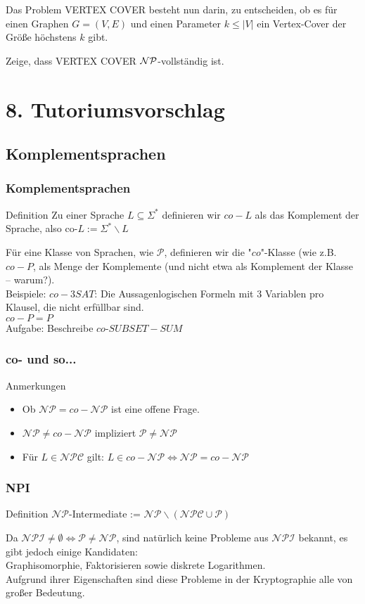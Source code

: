 \documentclass{beamer}
\begin{document}
{\begin{frame}
Das Problem \textsc{VERTEX COVER} besteht nun darin, zu entscheiden, ob es
für einen Graphen $G=(V,E)$ und einen Parameter $k \leq |V|$ ein Vertex-Cover
der Größe höchstens $k$ gibt.

Zeige, dass \textsc{VERTEX COVER} $\cal{NP}$-vollständig ist. 
\end{frame}

\section{8. Tutoriumsvorschlag}
\subsection{Komplementsprachen}
\begin{frame}
\frametitle{Komplementsprachen}
\begin{block}{Definition}
Zu einer Sprache $L \subseteq \Sigma^*$ definieren wir $co-L$ als das Komplement der Sprache, also
$\mbox{co-}L := \Sigma^*\backslash L$
\end{block}
Für eine Klasse von Sprachen, wie $\mathcal{P}$, definieren wir die "$co$"-Klasse (wie z.B. $co-P$, als Menge der Komplemente (und nicht etwa als Komplement der Klasse -- warum?).\\[8pt]
Beispiele: $co-3SAT$: Die Aussagenlogischen Formeln mit 3 Variablen pro Klausel, die nicht erfüllbar sind.\\
$co-P = P$\\[8pt]
Aufgabe: Beschreibe $co$-$SUBSET-SUM$
\end{frame}

\begin{frame}
\frametitle{co- und so...}
\begin{block}{Anmerkungen}
\begin{itemize}
\item Ob $\mathcal{NP} = co-\mathcal{NP}$ ist eine offene Frage.
\item $\mathcal{NP} \neq co-\mathcal{NP}$ impliziert $\mathcal{P} \neq \mathcal{NP}$ 
\item Für $L \in \mathcal{NPC}$ gilt: $L \in co-\mathcal{NP} \iff \mathcal{NP} =  co-\mathcal{NP}$
\end{itemize}
\end{block}
\end{frame}

\begin{frame}
\frametitle{NPI}
\begin{block}{Definition}
$\mathcal{NP}$-Intermediate := $\mathcal{NP} \backslash (\mathcal{NPC} \cup \mathcal{P})$
\end{block}
$$ $$ %
Da $\mathcal{NPI} \neq \emptyset \iff \mathcal{P} \neq \mathcal{NP}$, sind natürlich keine Probleme aus $\mathcal{NPI}$ bekannt, es gibt jedoch einige Kandidaten:\\
Graphisomorphie, Faktorisieren sowie diskrete Logarithmen.\\
Aufgrund ihrer Eigenschaften sind diese Probleme in der Kryptographie alle von großer Bedeutung.
\end{frame}


}
\end{document}
